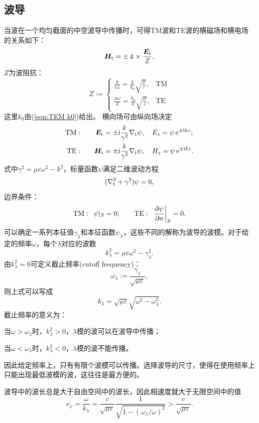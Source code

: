\subsection{波导}
当波在一个均匀截面的中空波导中传播时，可得TM波和TE波的横磁场和横电场的关系如下：
\[
    \bm H_\text t=\pm\mathop{}\!\hat{\bm z}\times\frac{\bm E_\text t}Z,
\]
$Z$为波阻抗：
\[
    Z:=\begin{cases}
        \frac k{\varepsilon\omega}=\frac k{k_0}\sqrt{\frac\mu\varepsilon},&\text{TM}\\
        \frac {\mu\omega}k=\frac {k_0}k\sqrt{\frac\mu\varepsilon},&\text{TE}
    \end{cases}
\]
这里$k_0$由(\ref{eqn:TEM k0})给出。
横向场可由纵向场决定
\begin{alignat*}{2}
    \text{TM}&:\quad&\bm E_\text t&=\pm\mathrm{i}\frac k{\gamma^2}\nabla_\text t\psi,\quad E_z=\psi\mathop{}\!\mathrm{e}^{\pm\mathrm{i} kz};\\
    \text{TE}&:\quad&\bm H_\text t&=\pm\mathrm{i}\frac k{\gamma^2}\nabla_\text t\psi,\quad H_z=\psi\mathop{}\!\mathrm{e}^{\pm\mathrm{i} kz}.
\end{alignat*}
式中$\gamma^2=\mu\varepsilon\omega^2-k^2$，标量函数$\psi$满足二维波动方程
\[
    (\nabla^2_\text t+\gamma^2)\psi=0,
\]
边界条件：
\[
    \text{TM}:\enspace\psi|_S=0;\qquad\text{TE}:\enspace\left.\frac{\partial^{\;\!\!}\psi}{\partial n^{\;\!\!}}\right\rvert_S=0.
\]
可以确定一系列本征值$\gamma_\lambda$和本征函数$\psi_\lambda$，这些不同的解称为波导的波模。对于给定的频率$\omega$，每个$\lambda$对应的波数
\[
    k_\lambda^2=\mu\varepsilon\omega^2-\gamma_\lambda^2.
\]
由$k_\lambda^2=0$可定义截止频率(cutoff frequency)：
\begin{equation}
    \label{eqn:cutoff omega}
    \omega_\lambda:=\frac{\gamma_\lambda}{\sqrt{\mu\varepsilon}},
\end{equation}
则上式可以写成
\[
    k_\lambda=\sqrt{\mu\varepsilon}\sqrt{\omega^2-\omega_\lambda^2}.
\]
截止频率的意义为：
\begin{compactitem}
    \item 当$\omega>\omega_\lambda$时，$k_\lambda^2>0$，$\lambda$模的波可以在波导中传播；
    \item 当$\omega<\omega_\lambda$时，$k_\lambda^2<0$，$\lambda$模的波不能传播。
\end{compactitem}
因此给定频率上，只有有限个波模可以传播。选择波导的尺寸，使得在使用频率上只能出现最低波模的波，这往往是最方便的。

波导中的波长总是大于自由空间中的波长，因此相速度就大于无限空间中的值
\[
    v_\varphi=\frac\omega{k_\lambda}=\frac c{\sqrt{\mu\varepsilon}}\frac1{\sqrt{1-(\omega_\lambda/\omega)^2}}>\frac c{\sqrt{\mu\varepsilon}}.
\]
